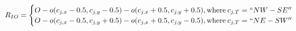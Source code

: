 \begin{equation}
R_{IO} = \begin{cases}
O - o(c_{j,x} - 0.5, c_{j,y} - 0.5) - o(c_{j,x} + 0.5, c_{j,y} + 0.5), \text{where\:} c_{j,T} = ``NW-SE'' \\
O - o(c_{j,x} - 0.5, c_{j,y} + 0.5) - o(c_{j,x} + 0.5, c_{j,y} - 0.5), \text{where\:} c_{j,T} = ``NE-SW'' \\
\end{cases}
\label{eq:r_io}
\end{equation}
